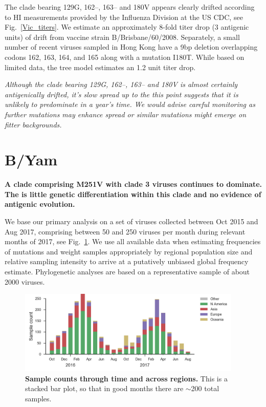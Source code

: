 \documentclass[11pt,oneside,letterpaper]{article}
\newcommand{\FIG}[1]{Fig.~\ref{#1}}
\begin{document}
The clade bearing 129G, 162--, 163-- and 180V appears clearly drifted
according to HI measurements provided by the Influenza Division at the
US CDC, see \FIG{Vic_titers}. We estimate an approximately 8-fold titer drop (3 antigenic
units) of drift from vaccine strain B/Brisbane/60/2008. Separately, a
small number of recent viruses sampled in Hong Kong have a 9bp deletion
overlapping codons 162, 163, 164, and 165 along with a mutation I180T.
While based on limited data, the tree model estimates an 1.2 unit titer
drop.



\emph{Although the clade bearing 129G, 162--, 163-- and 180V is almost
certainly antigenically drifted, it's slow spread up to the this point
suggests that it is unlikely to predominate in a year's time. We would
advise careful monitoring as further mutations may enhance spread or
similar mutations might emerge on fitter backgrounds.}

\clearpage
\section*{B/Yam}

\textbf{A clade comprising M251V with clade 3 viruses continues to
dominate. The is little genetic differentiation within this clade and no
evidence of antigenic evolution.}

We base our primary analysis on a set of viruses collected between Oct
2015 and Aug 2017, comprising between 50 and 250 viruses per month
during relevant months of 2017, see \FIG{Yam_counts}. We use all available data when
estimating frequencies of mutations and weight samples appropriately by
regional population size and relative sampling intensity to arrive at a
putatively unbiased global frequency estimate. Phylogenetic analyses are
based on a representative sample of about 2000 viruses.

\begin{figure}[H]
  \centering
  \includegraphics[width=0.95\textwidth]{../figures/sep-2017/yam_counts.png}
  \caption{\textbf{Sample counts through time and across regions.}
  This is a stacked bar plot, so that in good months there are $\sim$200 total samples.
  }
  \label{Yam_counts}
\end{figure}
\end{document}
